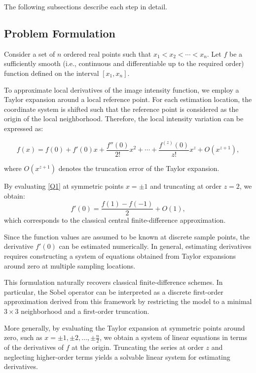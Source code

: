 \documentclass{elsarticle}
\begin{document}
The following subsections describe each step in detail.


\subsection{Problem Formulation}
Consider a set of $n$ ordered real points such that $x_1 < x_2 < \cdots < x_n$. Let $f$ be a sufficiently smooth (i.e., continuous and differentiable up to the required order) function defined on the interval $[x_1, x_n]$. 

To approximate local derivatives of the image intensity function, we employ a
Taylor expansion around a local reference point. For each estimation location,
the coordinate system is shifted such that the reference point is considered
as the origin of the local neighborhood. Therefore, the local intensity
variation can be expressed as:

\begin{equation}\label{Q1}
	f(x)=f(0)+f'(0)x+\frac{f''(0)}{2!}x^2+\cdots+
	\frac{f^{(z)}(0)}{z!}x^z+O(x^{z+1}),
\end{equation}

where $O(x^{z+1})$ denotes the truncation error of the Taylor expansion.

By evaluating \eqref{Q1} at symmetric points $x = \pm 1$ and truncating at order $z = 2$, we obtain:
\begin{equation}\label{Q2}
	f'(0) = \frac{f(1) - f(-1)}{2} + O(1),
\end{equation}
which corresponds to the classical central finite-difference approximation.

Since the function values are assumed to be known at discrete sample points, the derivative $f'(0)$ can be estimated numerically. In general, estimating derivatives requires constructing a system of equations obtained from Taylor expansions around zero at multiple sampling locations.

This formulation naturally recovers classical finite-difference schemes. In particular, the Sobel operator can be interpreted as a discrete first-order approximation derived from this framework by restricting the model to a minimal $3 \times 3$ neighborhood and a first-order truncation.

More generally, by evaluating the Taylor expansion at symmetric points around zero, such as $x = \pm 1, \pm 2, \ldots, \pm \frac{n}{2}$, we obtain a system of linear equations in terms of the derivatives of $f$ at the origin. Truncating the series at order $z$ and neglecting higher-order terms yields a solvable linear system for estimating derivatives.
\end{document}
